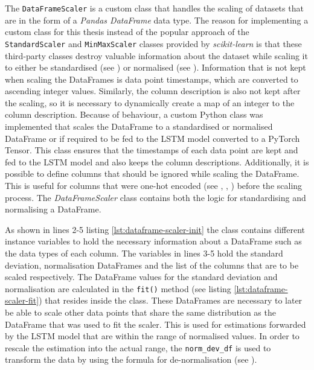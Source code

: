   The \texttt{DataFrameScaler} is a custom class that handles the scaling of datasets that are in the form of a \emph{Pandas DataFrame} data type. 
  The reason for implementing a custom class for this thesis instead of the popular approach of the \texttt{StandardScaler} and \texttt{MinMaxScaler} classes provided by \emph{scikit-learn} is that these third-party classes destroy valuable information about the dataset while scaling it to either be standardised (see ) or normalised (see ). 
  Information that is not kept when scaling the DataFrames is data point timestamps, which are converted to ascending integer values. Similarly, the column description is also not kept after the scaling, so it is necessary to dynamically create a map of an integer to the column description.
  Because of behaviour, a custom Python class was implemented that scales the DataFrame to a standardised or normalised DataFrame or if required to be fed to the LSTM model converted to a PyTorch Tensor.
  This class ensures that the timestamps of each data point are kept and fed to the LSTM model and also keeps the column descriptions. Additionally, it is possible to define columns that should be ignored while scaling the DataFrame. This is useful for columns that were one-hot encoded (see , , ) before the scaling process.
  The \emph{DataFrameScaler} class contains both the logic for standardising and normalising a DataFrame.

  

  As shown in lines 2-5 listing \ref{lst:dataframe-scaler-init} the class contains different instance variables to hold the necessary information about a DataFrame such as the data types of each column.
  The variables in lines 3-5 hold the standard deviation, normalisation DataFrames and the list of the columns that are to be scaled respectively. The DataFrame values for the standard deviation and normalisation are calculated in the \texttt{fit()} method (see listing \ref{lst:dataframe-scaler-fit}) that resides inside the class.
  These DataFrames are necessary to later be able to scale other data points that share the same distribution as the DataFrame that was used to fit the scaler. 
  This is used for estimations forwarded by the LSTM model that are within the range of normalised values.
  In order to rescale the estimation into the actual range, the \texttt{norm\_dev\_df} is used to transform the data by using the formula for de-normalisation (see ).

